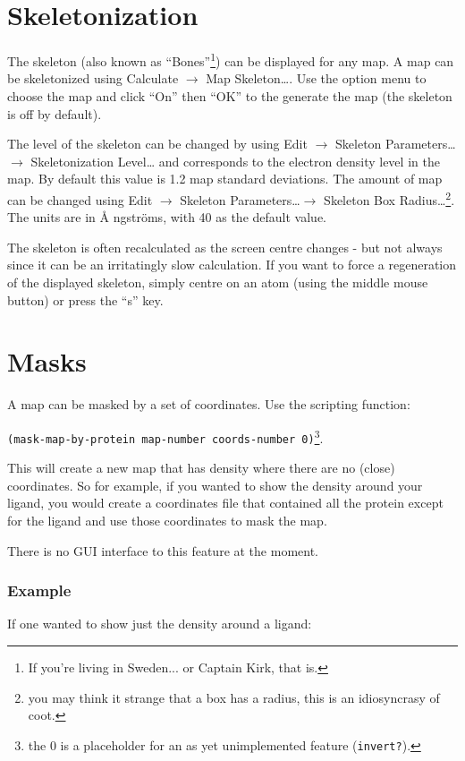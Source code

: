 \documentclass{book}
\begin{document}
\section{Skeletonization}
\label{skeletonization}
  The skeleton (also known as
``Bones''\footnote{If you're living in Sweden... or Captain Kirk, that
  is.}) can be displayed for any map.  A map can be skeletonized using
\textsf{Calculate $\rightarrow$ Map Skeleton\ldots}.  Use the option
menu to choose the map and click ``On'' then ``OK'' to the generate
the map (the skeleton is off by default).

The level of the skeleton can be changed by using \textsf{Edit
  $\rightarrow$ Skeleton Parameters\ldots $\rightarrow$
  Skeletonization Level\ldots} and corresponds to the electron density
level in the map.  By default this value is 1.2 map standard
deviations.  The amount of map can be changed using \textsf{Edit
  $\rightarrow$ Skeleton Parameters\ldots $\rightarrow$ Skeleton Box
  Radius\ldots}\footnote{you may think it strange that a box has a
  radius, this is an idiosyncrasy of coot.}.  The units are in \AA
ngstr\"oms, with 40 as the default value.

The skeleton is often recalculated as the screen centre changes - but
not always since it can be an irritatingly slow calculation.
If you want to force a regeneration of
the displayed skeleton, simply centre on an atom (using the middle
mouse button) or press the ``s'' key.

\section{Masks}
\label{masks}
 A map can be masked by a set of coordinates. Use the
scripting function: 

\texttt{(mask-map-by-protein map-number
  coords-number 0)}\footnote{the 0 is a placeholder for an as yet
  unimplemented feature (\texttt{invert?}).}.  

This will create a new
map that has density where there are no (close) coordinates.  So for
example, if you wanted to show the density around your ligand, you
would create a coordinates file that contained all the protein except
for the ligand and use those coordinates to mask the map.

There is no GUI interface to this feature at the moment.

\subsubsection{Example}
If one wanted to show just the density around a ligand:
\end{document}
